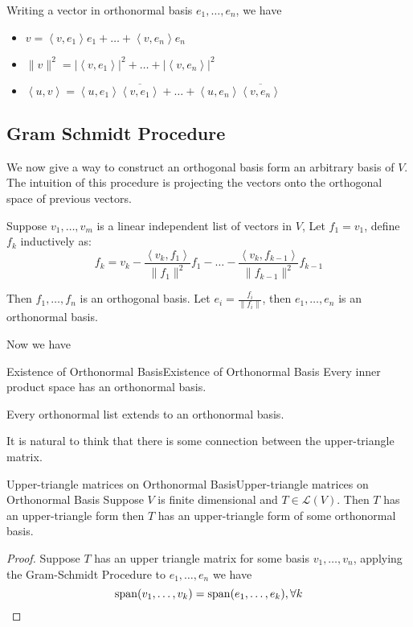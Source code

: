 \documentclass[../main.tex]{subfiles}
\begin{document}
Writing a vector in orthonormal basis $e_1, \ldots ,e_n$, we have
\begin{itemize}
\item $v=\left<v,e_1\right>e_1 + \ldots + \left<v,e_n\right> e_n $
\item $\|v\|^2 = \left|\left<v,e_1\right>\right|^2 +\ldots + \left|\left<v,e_n\right> \right|^2$
\item $\left<u,v\right> = \left<u,e_1\right> \overline{\left<v,e_1\right> } + \ldots + \left<u,e_n\right> \overline{\left<v,e_n\right> }$
\end{itemize}

\subsection{Gram Schmidt Procedure}
We now give a way to construct an orthogonal basis form an arbitrary basis of $V$. The intuition of this procedure is projecting the vectors onto the orthogonal space of previous vectors.

\begin{plainblackenv}
Suppose $v_1, \ldots ,v_m$ is a linear independent list of vectors in $V$, Let $f_1=v_1$, define $f_k$ inductively as:
\begin{equation*}
f_k = v_k - \frac{\left<v_k,f_1\right> }{\|f_1\|^2}f_1 - \ldots -\frac{\left<v_k,f_{k-1}\right> }{\|f_{k-1}\|^2}f_{k-1}
\end{equation*}

Then $f_1, \ldots ,f_n$ is an orthogonal basis. Let $\displaystyle e_i = \frac{f_i}{\|f_i\|}$, then $e_1, \ldots ,e_n$ is an orthonormal basis.
\end{plainblackenv}

Now we have
\begin{corollary}{Existence of Orthonormal Basis}{Existence of Orthonormal Basis}
Every inner product space has an orthonormal basis.

Every orthonormal list extends to an orthonormal basis.
\end{corollary}

It is natural to think that there is some connection between the upper-triangle matrix.
\begin{theorem}{Upper-triangle matrices on Orthonormal Basis}{Upper-triangle matrices on Orthonormal Basis}
Suppose $V$ is finite dimensional and $T\in \mathscr{L}(V)$. Then $T$ has an upper-triangle form then $T$ has an upper-triangle form of some orthonormal basis. 
\end{theorem}
\begin{proof}
Suppose $T$ has an upper triangle matrix for some basis $v_1, \ldots ,v_n$, applying the Gram-Schmidt Procedure to $e_1, \ldots ,e_n$ we have
\begin{equation*}
\operatorname{span} (v_1, \ldots ,v_k) = \operatorname{span} (e_1, \ldots ,e_k), \forall k
\end{equation*}
\end{proof}
\end{document}
